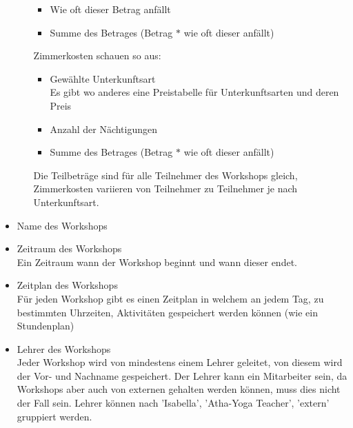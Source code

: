 \begin{itemize}[leftmargin=1.0in]
\begin{itemize}
\begin{itemize}
                \item Wie oft dieser Betrag anfällt
                \item Summe des Betrages (Betrag $*$ wie oft dieser anfällt) 
            \end{itemize}
            Zimmerkosten schauen so aus:
            \begin{itemize}
                \item Gewählte Unterkunftsart\\
                Es gibt wo anderes eine Preistabelle für Unterkunftsarten und deren Preis
                \item Anzahl der Nächtigungen\\
                \item Summe des Betrages (Betrag $*$ wie oft dieser anfällt) 
            \end{itemize}
        Die Teilbeträge sind für alle Teilnehmer des Workshops gleich, Zimmerkosten variieren von Teilnehmer zu Teilnehmer je nach Unterkunftsart.
    \end{itemize}
    \item [\ld] Name des Workshops 
    \item [\ld] Zeitraum des Workshops\\
    Ein Zeitraum wann der Workshop beginnt und wann dieser endet.
    \item [\ld] Zeitplan des Workshops\\
        Für jeden Workshop gibt es einen Zeitplan in welchem an jedem Tag, zu bestimmten Uhrzeiten, Aktivitäten gespeichert werden können (wie ein Stundenplan)
    \item [\ld] Lehrer des Workshops\\
        Jeder Workshop wird von mindestens einem Lehrer geleitet, von diesem wird der Vor- und Nachname gespeichert. Der Lehrer kann ein Mitarbeiter sein, da Workshops aber auch von externen gehalten werden können, muss dies nicht der Fall sein. Lehrer können nach 'Isabella', 'Atha-Yoga Teacher', 'extern' gruppiert werden.

\end{itemize}
